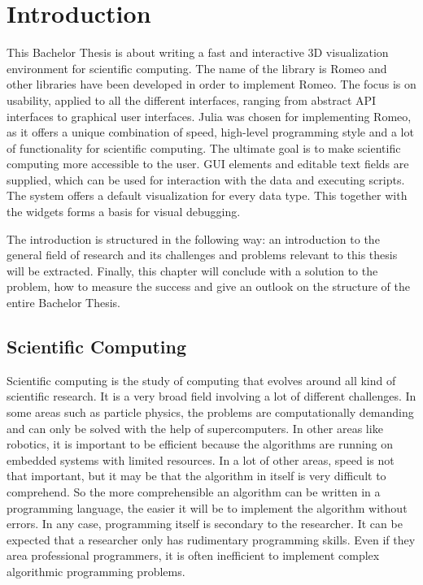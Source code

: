 \section{Introduction}
This Bachelor Thesis is about writing a fast and interactive 3D visualization environment for scientific computing.
The name of the library is Romeo and other libraries have been developed in order to implement Romeo. 
The focus is on usability, applied to all the different interfaces, ranging from abstract \ac{API} interfaces to graphical user interfaces. 
Julia was chosen for implementing Romeo, as it offers a unique combination of speed, high-level programming style and a lot of functionality for scientific computing.
The ultimate goal is to make scientific computing more accessible to the user.
\ac{GUI} elements and editable text fields are supplied, which can be used for interaction with the data and executing scripts.
The system offers a default visualization for every data type. This together with the widgets forms a basis for visual debugging.

The introduction is structured in the following way:
an introduction to the general field of research and its challenges and problems relevant to this thesis will be extracted.
Finally, this chapter will conclude with a solution to the problem, how to measure the success and give an outlook on the structure of the entire Bachelor Thesis.


\subsection{Scientific Computing}

Scientific computing is the study of computing that evolves around all kind of scientific research.
It is a very broad field involving a lot of different challenges. 
In some areas such as particle physics, the problems are computationally demanding and can only be solved with the help of supercomputers.
In other areas like robotics, it is important to be efficient because the algorithms are running on embedded systems with limited resources. 
In a lot of other areas, speed is not that important, but it may be that the algorithm in itself is very difficult to comprehend. 
So the more comprehensible an algorithm can be written in a programming language, the easier it will be to implement the algorithm without errors.
In any case, programming itself is secondary to the researcher.
It can be expected that a researcher only has rudimentary programming skills. 
Even if they area professional programmers, it is often inefficient to implement complex algorithmic programming problems.

